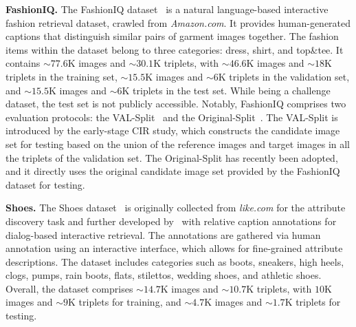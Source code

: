 \textbf{FashionIQ.} 
The FashionIQ dataset~\cite{wu2021fiq} is a natural language-based interactive fashion retrieval dataset, crawled from \textit{Amazon.com}. It provides human-generated captions that distinguish similar pairs of garment images together. The fashion items within the dataset belong to three categories: dress, shirt, and top\&tee. It contains $\sim77.6$K images and $\sim30.1$K triplets, with $\sim46.6$K images and $\sim18$K triplets in the training set, $\sim15.5$K images and $\sim6$K triplets in the validation set, and $\sim15.5$K images and $\sim6$K triplets in the test set. While being a challenge dataset, the test set is not publicly accessible.
Notably, FashionIQ comprises two evaluation protocols: the VAL-Split~\cite{chen2020val} and the Original-Split~\cite{wu2021fiq}. The VAL-Split is introduced by the early-stage CIR study, which constructs the candidate image set for testing based on the union of the reference images and target images in all the triplets of the validation set. The Original-Split has recently been adopted, and it directly uses the original candidate image set provided by the FashionIQ dataset for testing. 




\textbf{Shoes.}
The Shoes dataset~\cite{berg2010automatic} is originally collected from \textit{like.com} for the attribute discovery task and further developed by~\cite{guo2018dialog} with relative caption annotations for dialog-based interactive retrieval. The annotations are gathered via human annotation using an interactive interface, which allows for fine-grained attribute descriptions. The dataset includes categories such as boots, sneakers, high heels, clogs, pumps, rain boots, flats, stilettos, wedding shoes, and athletic shoes. Overall, the dataset comprises $\sim14.7$K images and $\sim10.7$K triplets, with $10$K images and $\sim9$K triplets for training, and $\sim4.7$K images and $\sim1.7$K triplets for testing. 

